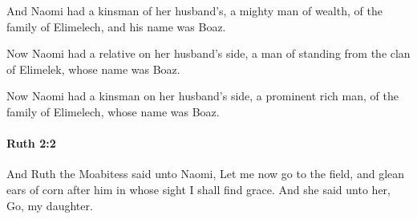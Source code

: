 			\begin{versebox}
					\item[BHS] 
					\item[LXX] 
					\item[ASV] And Naomi had a kinsman of her husband's, a mighty man of wealth, of the family of Elimelech, and his name was Boaz.
					\item[NIV] Now Naomi had a relative on her husband’s side, a man of standing from the clan of Elimelek, whose name was Boaz.
					\item[NRSV] Now Naomi had a kinsman on her husband’s side, a prominent rich man, of the family of Elimelech, whose name was Boaz.
			\end{versebox}

		\paragraph{Ruth 2:2} %
			\label{RUTH-2-2}

			And Ruth the Moabitess said unto Naomi, Let me now go to the field, and glean ears of corn after him in whose sight I shall find grace. And she said unto her, Go, my daughter.

